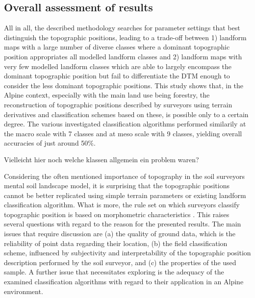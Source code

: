 \documentclass[preprint,12pt,authoryear]{elsarticle}
\begin{document}
\subsection{Overall assessment of results}
All in all, the described methodology searches for parameter settings that best distinguish the topographic positions, leading to a trade-off between 1) landform maps with a large number of diverse classes where a dominant topographic position appropriates all modelled landform classes and 2) landform maps with very few modelled landform classes which are able to largely encompass the dominant topographic position but fail to differentiate the DTM enough to consider the less dominant topographic positions.
This study shows that, in the Alpine context, especially with the main land use being forestry, the reconstruction of topographic positions described by surveyors using terrain derivatives and classification schemes based on these, is possible only to a certain degree. The various investigated classification algorithms performed similarily at the  macro scale with 7 classes and at meso scale with 9 classes, yielding overall accuracies of just around 50\%.

Vielleicht hier noch welche klassen allgemein ein problem waren?

 Considering the often mentioned importance of topography in the soil surveyors mental soil landscape model, it is surprising that the topographic positions cannot be better replicated using simple terrain parameters or existing landform classification algorithm. What is more, the rule set on which surveyors classify topographic position is based on morphometric characteristics \citep{Englisch1998}. This raises several questions with regard to the reason for the presented results. The main issues that require discussion are (a) the quality of ground data, which is the reliability of point data regarding their location, (b) the field classification scheme, influenced by subjectivity and interpretability of the topographic position description performed by the soil surveyor, and (c) the properties of the used sample. A further issue that necessitates exploring is the adequacy of the examined classification algorithms with regard to their application in an Alpine environment. 
\end{document}
